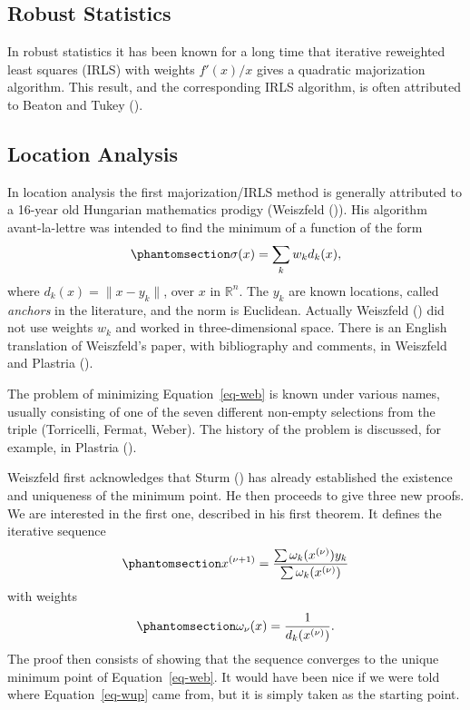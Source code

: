 \documentclass[
  12pt,
  letterpaper,
  DIV=11,
  numbers=noendperiod]{scrartcl}
\theoremstyle{definition}
\theoremstyle{plain}
\theoremstyle{plain}
\theoremstyle{plain}
\theoremstyle{definition}
\theoremstyle{remark}
\begin{document}
\subsection{Robust Statistics}\label{robust-statistics}

In robust statistics it has been known for a long time that iterative
reweighted least squares (IRLS) with weights \(f'(x)/x\) gives a
quadratic majorization algorithm. This result, and the corresponding
IRLS algorithm, is often attributed to Beaton and Tukey
().

\subsection{Location Analysis}\label{location-analysis}

In location analysis the first majorization/IRLS method is generally
attributed to a 16-year old Hungarian mathematics prodigy (Weiszfeld
()). His algorithm avant-la-lettre was
intended to find the minimum of a function of the form
\begin{equation}\phantomsection\label{eq-web}{
\sigma(x)=\sum_k w_kd_k(x),
}\end{equation} where \(d_k(x)=\|x-y_k\|\), over \(x\) in
\(\mathbb{R}^n\). The \(y_k\) are known locations, called \emph{anchors}
in the literature, and the norm is Euclidean. Actually Weiszfeld
() did not use weights \(w_k\) and
worked in three-dimensional space. There is an English translation of
Weiszfeld's paper, with bibliography and comments, in Weiszfeld and
Plastria ().

The problem of minimizing Equation~\ref{eq-web} is known under various
names, usually consisting of one of the seven different non-empty
selections from the triple (Torricelli, Fermat, Weber). The history of
the problem is discussed, for example, in Plastria
().

Weiszfeld first acknowledges that Sturm ()
has already established the existence and uniqueness of the minimum
point. He then proceeds to give three new proofs. We are interested in
the first one, described in his first theorem. It defines the iterative
sequence \begin{equation}\phantomsection\label{eq-wup}{
x^{(\nu+1)}=\frac{\sum\omega_k(x^{(\nu)})y_k}{\sum\omega_k(x^{(\nu)})}
}\end{equation} with weights
\begin{equation}\phantomsection\label{eq-ww}{
\omega_\nu(x)=\frac{1}{d_k(x^{(\nu)})}.
}\end{equation} The proof then consists of showing that the sequence
converges to the unique minimum point of Equation~\ref{eq-web}. It would
have been nice if we were told where Equation~\ref{eq-wup} came from,
but it is simply taken as the starting point.
\end{document}
